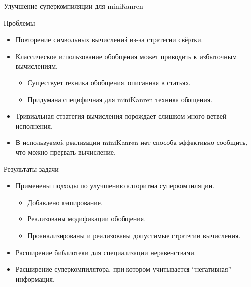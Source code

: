 \documentclass[xcolor=table]{beamer}
\newcommand{\citepres}[1]{{\it \citetitle{#1}}, \citeauthor{#1}, \citeyear{#1}}
\begin{document}
\begin{frame}{Улучшение суперкомпиляции для miniKanren}
\begin{block}{Проблемы}
\begin{itemize}
\item Повторение символьных вычислений из-за стратегии свёртки.
\item Классическое использование обобщения может приводить к избыточным вычислениям.
\begin{itemize}
\item Существует техника обобщения, описанная в статьях\footnotemark.
\item Придумана специфичная для miniKanren техника обощения.
\end{itemize}

\item Тривиальная стратегия вычисления порождает слишком много ветвей исполнения.
\item В используемой реализации miniKanren нет способа эффективно сообщить, что можно прервать вычисление.
\end{itemize}
\end{block}
\footnotetext{\citepres{scPos}}
\end{frame}

\begin{frame}{Результаты задачи}
\begin{itemize}
\item Применены подходы по улучшению алгоритма суперкомпиляции.
\begin{itemize}
\item Добавлено кэширование.
\item Реализованы модификации обобщения.
\item Проанализированы и реализованы допустимые стратегии вычисления.
\end{itemize}
\item Расширение библиотеки для специализации неравенствами.
\item Расширение суперкомпилятора, при котором учитывается
      ``негативная'' информация.
\end{itemize}
\end{frame}
\end{document}
